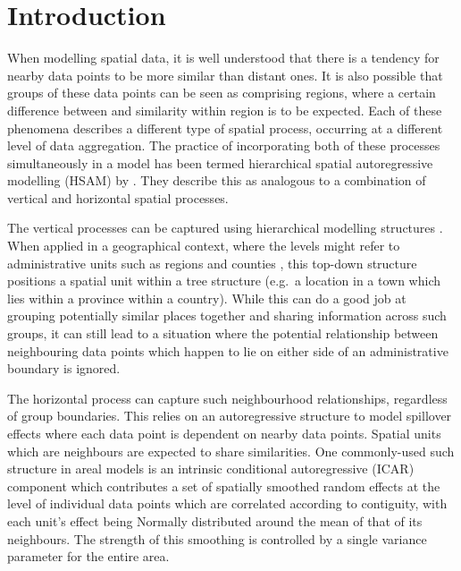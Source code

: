 \documentclass[webpdf,large,contemporary,namedate]{oup-authoring-template}
\theoremstyle{thmstyleone}
\theoremstyle{thmstyletwo}
\theoremstyle{thmstylethree}
\begin{document}


\maketitle


\section{Introduction}\label{introduction}

When modelling spatial data, it is well understood that there is a
tendency for nearby data points to be more similar than distant ones. It
is also possible that groups of these data points can be seen as
comprising regions, where a certain difference between and similarity
within region is to be expected. Each of these phenomena describes a
different type of spatial process, occurring at a different level of
data aggregation. The practice of incorporating both of these processes
simultaneously in a model has been termed hierarchical spatial
autoregressive modelling (HSAM) by \citet{dong2015}. They describe this
as analogous to a combination of vertical and horizontal spatial
processes.

The vertical processes can be captured using hierarchical modelling
structures \citep{goldstein1997}. When applied in a geographical
context, where the levels might refer to administrative units such as
regions and counties \citep{jones1991}, this top-down structure
positions a spatial unit within a tree structure (e.g.~a location in a
town which lies within a province within a country). While this can do a
good job at grouping potentially similar places together and sharing
information across such groups, it can still lead to a situation where
the potential relationship between neighbouring data points which happen
to lie on either side of an administrative boundary is ignored.

The horizontal process can capture such neighbourhood relationships,
regardless of group boundaries. This relies on an autoregressive
structure to model spillover effects where each data point is dependent
on nearby data points. Spatial units which are neighbours are expected
to share similarities. One commonly-used such structure in areal models
is an intrinsic conditional autoregressive (ICAR) component
\citep{besag1974} which contributes a set of spatially smoothed random
effects at the level of individual data points which are correlated
according to contiguity, with each unit's effect being Normally
distributed around the mean of that of its neighbours. The strength of
this smoothing is controlled by a single variance parameter for the
entire area.
\end{document}
